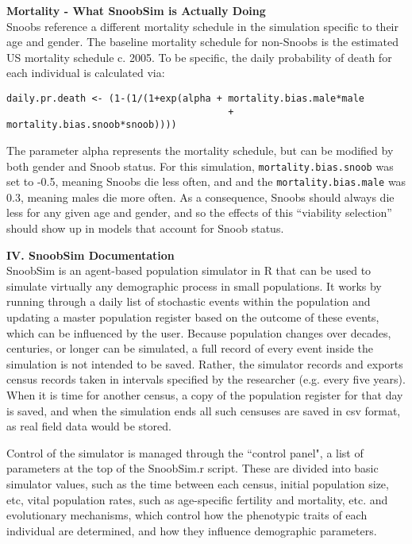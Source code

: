 \documentclass[11pt]{article}
\begin{document}
\textbf{Mortality - What SnoobSim is Actually Doing}\\

Snoobs reference a different mortality schedule in the simulation specific to their age and gender.  The baseline mortality schedule for non-Snoobs is the estimated US mortality schedule c. 2005.  To be specific, the daily probability of death for each individual is calculated via:

\begin{verbatim}
daily.pr.death <- (1-(1/(1+exp(alpha + mortality.bias.male*male 
                                       + mortality.bias.snoob*snoob))))
\end{verbatim}

The parameter alpha represents the mortality schedule, but can be modified by both gender and Snoob status.  For this simulation, \texttt{mortality.bias.snoob} was set to -0.5, meaning Snoobs die less often, and and the \texttt{mortality.bias.male} was 0.3, meaning males die more often.  As a consequence, Snoobs should always die less for any given age and gender, and so the effects of this ``viability selection'' should show up in models that account for Snoob status.  





\newpage
\textbf{IV. SnoobSim Documentation}\\

SnoobSim is an agent-based population simulator in R that can be used to simulate virtually any demographic process in small populations.  It works by running through a daily list of stochastic events within the population and updating a master population register based on the outcome of these events, which can be influenced by the user.  Because population changes over decades, centuries, or longer can be simulated, a full record of every event inside the simulation is not intended to be saved.  Rather, the simulator records and exports census records taken in intervals specified by the researcher (e.g. every five years).  When it is time for another census, a copy of the population register for that day is saved, and when the simulation ends all such censuses are saved in csv format, as real field data would be stored.
  
Control of the simulator is managed through the ``control panel", a list of parameters at the top of the SnoobSim.r script.  These are divided into basic simulator values, such as the time between each census, initial population size, etc, vital population rates, such as age-specific fertility and mortality, etc. and evolutionary mechanisms, which control how the phenotypic traits of each individual are determined, and how they influence demographic parameters.  
\end{document}
